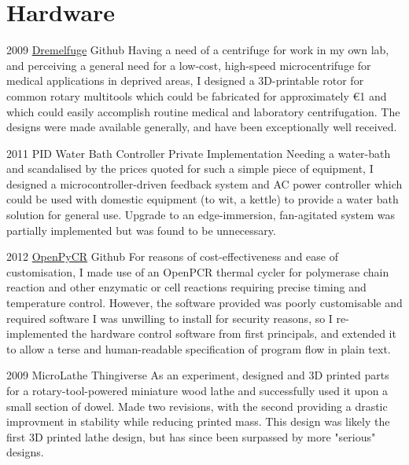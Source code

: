 \documentclass[]{friggeri-cv} %
\begin{document}
\section{Hardware}
\begin{entrylist}
\entry
{2009}
{\href{https://github.com/cathalgarvey/dremelfuge}{Dremelfuge}}
{Github}
{Having a need of a centrifuge for work in my own lab, and perceiving a general
need for a low-cost, high-speed microcentrifuge for medical applications in deprived
areas, I designed a 3D-printable rotor for common rotary multitools which could be
fabricated for approximately \euro1 and which could easily accomplish routine medical and
laboratory centrifugation. The designs were made available generally, and have been
exceptionally well received.
}

\entry
{2011}
{PID Water Bath Controller}
{Private Implementation}
{Needing a water-bath and scandalised by the prices quoted for such a simple piece
of equipment, I designed a microcontroller-driven feedback system and AC power controller
which could be used with domestic equipment (to wit, a kettle) to provide a water bath
solution for general use. Upgrade to an edge-immersion, fan-agitated system was partially
implemented but was found to be unnecessary.
}

\entry
{2012}
{\href{https://github.com/cathalgarvey/openpycr}{OpenPyCR}}
{Github}
{For reasons of cost-effectiveness and ease of customisation, I made use of an OpenPCR
thermal cycler for polymerase chain reaction and other enzymatic or cell reactions requiring
precise timing and temperature control. However, the software provided was poorly customisable
and required software I was unwilling to install for security reasons, so I re-implemented
the hardware control software from first principals, and extended it to allow a terse and
human-readable specification of program flow in plain text.
}

\entry
{2009}
{MicroLathe}
{Thingiverse}
{As an experiment, designed and 3D printed parts for a rotary-tool-powered miniature wood
lathe and successfully used it upon a small section of dowel. Made two revisions, with the
second providing a drastic improvment in stability while reducing printed mass. This design
was likely the first 3D printed lathe design, but has since been surpassed by more "serious"
designs.
}

\end{entrylist}

\end{document}
